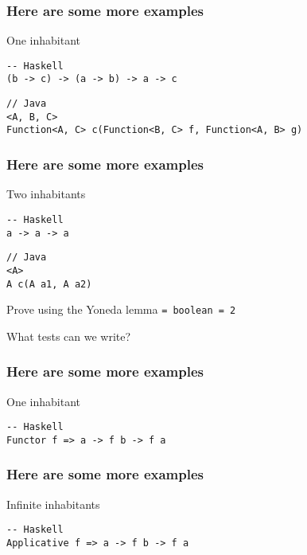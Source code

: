 \begin{frame}[fragile]
\frametitle{Here are some more examples}
\begin{block}{One inhabitant}
\begin{lstlisting}[style=haskell]
-- Haskell
(b -> c) -> (a -> b) -> a -> c
\end{lstlisting}

\begin{lstlisting}[style=java]
// Java
<A, B, C>
Function<A, C> c(Function<B, C> f, Function<A, B> g)
\end{lstlisting}
\end{block}
\end{frame}

\begin{frame}[fragile]
\frametitle{Here are some more examples}
\begin{block}{Two inhabitants}
\begin{lstlisting}[style=haskell]
-- Haskell
a -> a -> a
\end{lstlisting}

\begin{lstlisting}[style=java]
// Java
<A>
A c(A a1, A a2)
\end{lstlisting}
\end{block}
\begin{center}
Prove using the Yoneda lemma \lstinline{= boolean = 2}

What tests can we write?
\end{center}
\end{frame}

\begin{frame}[fragile]
\frametitle{Here are some more examples}
\begin{block}{One inhabitant}
\begin{lstlisting}[style=haskell]
-- Haskell
Functor f => a -> f b -> f a
\end{lstlisting}
\end{block}
\end{frame}

\begin{frame}[fragile]
\frametitle{Here are some more examples}
\begin{block}{Infinite inhabitants}
\begin{lstlisting}[style=haskell]
-- Haskell
Applicative f => a -> f b -> f a
\end{lstlisting}
\end{block}
\end{frame}
